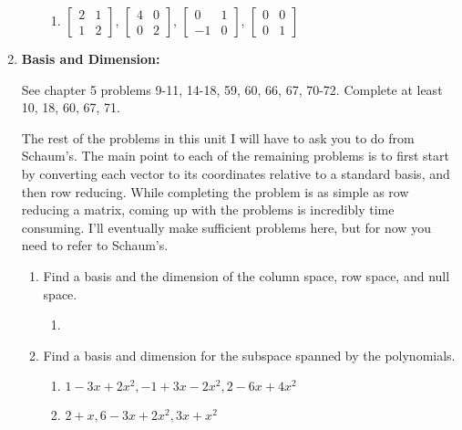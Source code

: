 \begin{enumerate}
\begin{enumerate}
\begin{multicols}{2}
\begin{enumerate}
\item 
$\begin{bmatrix}
 2 & 1 \\
 1 & 2
\end{bmatrix}$,
$\begin{bmatrix}
 4 & 0 \\
 0 & 2
\end{bmatrix}$,
$\begin{bmatrix}
 0 & 1 \\
 -1 & 0
\end{bmatrix}$,
$\begin{bmatrix}
 0 & 0 \\
 0 & 1
\end{bmatrix}$

		\end{enumerate}
\end{multicols}
\end{enumerate}















\item \textbf{Basis and Dimension:} 

See chapter 5 problems 9-11, 14-18, 59, 60, 66, 67, 70-72. 
Complete at least 10, 18, 60, 67, 71.

The rest of the problems in this unit I will have to ask you to do from Schaum's.  The main point to each of the remaining problems is to first start by converting each vector to its coordinates relative to a standard basis, and then row reducing.  While completing the problem is as simple as row reducing a matrix, coming up with the problems is incredibly time consuming. I'll eventually make sufficient problems here, but for now you need to refer to Schaum's.

\begin{enumerate}
	\item Find a basis and the dimension of the column space, row space, and null space.
		\begin{enumerate}
			\item 
		\end{enumerate}

	\item Find a basis and dimension for the subspace spanned by the polynomials.
		\begin{enumerate}
			\item $1-3x+2x^2, -1+3x-2x^2, 2-6x+4x^2$
			\item $2+x, 6-3x+2x^2, 3x+x^2$
		\end{enumerate}


\end{enumerate}
\end{enumerate}
